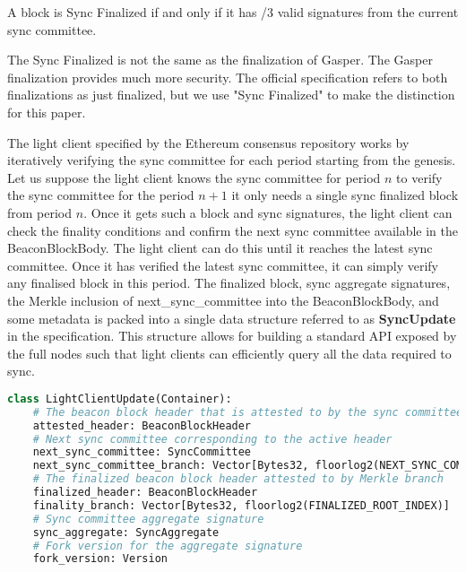 \begin{definition}
  A block is Sync Finalized if and only if it has /3 valid signatures from the current sync committee. 
  \end{definition}
  \begin{remark}
  The Sync Finalized is not the same as the finalization of Gasper. The Gasper finalization provides much more security. 
  The official specification refers to both finalizations as just finalized, but we use "Sync Finalized" to make the distinction for this paper.
  \end{remark}
  The light client specified by the Ethereum consensus repository works by iteratively verifying the sync committee for each period starting from the genesis. 
  Let us suppose the light client knows the sync committee for period $n$ to verify the sync committee for the period $n + 1$ it only needs a single sync finalized block from period $n$. 
  Once it gets such a block and sync signatures, the light client can check the finality conditions and confirm the next sync committee available in the BeaconBlockBody. 
  The light client can do this until it reaches the latest sync committee. 
  Once it has verified the latest sync committee, it can simply verify any finalised block in this period. 
  The finalized block, sync aggregate signatures, the Merkle inclusion of next\_sync\_committee into the BeaconBlockBody, and some metadata is packed into a single data structure referred to as \textbf{SyncUpdate} in the specification. 
  This structure allows for building a standard API exposed by the full nodes such that light clients can efficiently query all the data required to sync.      
  \begin{lstlisting}[language=Python,caption={The above code is from the light client specification \cite{EthereumConcensusSpecs}},captionpos=b]
  class LightClientUpdate(Container):
    # The beacon block header that is attested to by the sync committee
    attested_header: BeaconBlockHeader
    # Next sync committee corresponding to the active header
    next_sync_committee: SyncCommittee
    next_sync_committee_branch: Vector[Bytes32, floorlog2(NEXT_SYNC_COMMITTEE_INDEX)]
    # The finalized beacon block header attested to by Merkle branch
    finalized_header: BeaconBlockHeader
    finality_branch: Vector[Bytes32, floorlog2(FINALIZED_ROOT_INDEX)]
    # Sync committee aggregate signature
    sync_aggregate: SyncAggregate
    # Fork version for the aggregate signature
    fork_version: Version
\end{lstlisting}
  
